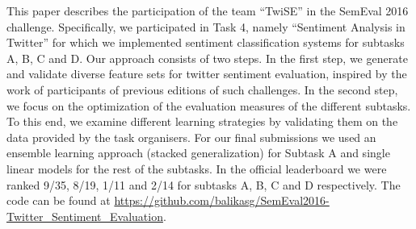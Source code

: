 This paper describes the participation of the team ``TwiSE'' in the SemEval 2016 challenge. Specifically, we participated in Task 4, namely ``Sentiment Analysis in Twitter'' for which we implemented sentiment classification systems for subtasks A, B, C and D. Our approach consists of two steps. In the first step, we generate and validate diverse  feature sets for twitter sentiment evaluation, inspired by the work of participants of previous editions of such challenges. In the second step, we focus on the optimization of the evaluation measures of the different subtasks. To this end, we examine different learning strategies by validating them on the data provided by the task organisers. For our final submissions we used an ensemble learning approach (stacked generalization) for Subtask A and single linear models for the rest of the subtasks. In the official leaderboard we were ranked 9/35, 8/19, 1/11 and 2/14 for subtasks A, B, C and D respectively. The code can be found at \url{https://github.com/balikasg/SemEval2016-Twitter\_Sentiment\_Evaluation}.
